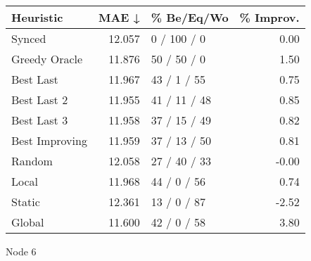 \begin{tabular}{lrlr}
\toprule
\textbf{Heuristic} & \textbf{MAE ↓} & \textbf{\% Be/Eq/Wo} & \textbf{\% Improv.} \\
\midrule
            Synced &         12.057 &          0 / 100 / 0 &                0.00 \\
     Greedy Oracle &         11.876 &          50 / 50 / 0 &                1.50 \\
         Best Last &         11.967 &          43 / 1 / 55 &                0.75 \\
       Best Last 2 &         11.955 &         41 / 11 / 48 &                0.85 \\
       Best Last 3 &         11.958 &         37 / 15 / 49 &                0.82 \\
    Best Improving &         11.959 &         37 / 13 / 50 &                0.81 \\
            Random &         12.058 &         27 / 40 / 33 &               -0.00 \\
             Local &         11.968 &          44 / 0 / 56 &                0.74 \\
            Static &         12.361 &          13 / 0 / 87 &               -2.52 \\
            Global &         11.600 &          42 / 0 / 58 &                3.80 \\
\bottomrule
\end{tabular}
\caption{Node 6}
\label{tab:ds_iid_lr05_le2_bs4_6}
